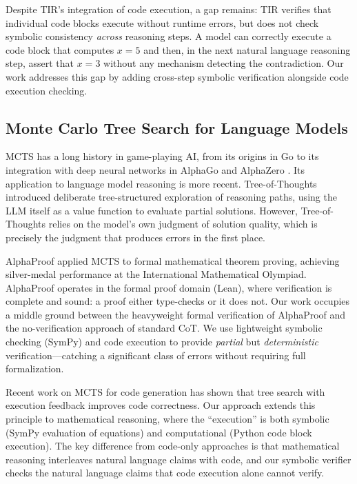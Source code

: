 \documentclass[11pt,a4paper]{article}
\begin{document}
Despite TIR's integration of code execution, a gap remains: TIR verifies that
individual code blocks execute without runtime errors, but does not check
symbolic consistency \emph{across} reasoning steps. A model can correctly
execute a code block that computes $x = 5$ and then, in the next natural
language reasoning step, assert that $x = 3$ without any mechanism detecting
the contradiction. Our work addresses this gap by adding cross-step symbolic
verification alongside code execution checking.

\subsection{Monte Carlo Tree Search for Language Models}

MCTS has a long history in game-playing AI, from its origins in Go
\citep{coulom2006efficient, kocsis2006bandit} to its integration with deep
neural networks in AlphaGo and AlphaZero \citep{silver2017mastering}. Its
application to language model reasoning is more recent. Tree-of-Thoughts
\citep{yao2023tree} introduced deliberate tree-structured exploration of
reasoning paths, using the LLM itself as a value function to evaluate partial
solutions. However, Tree-of-Thoughts relies on the model's own judgment of
solution quality, which is precisely the judgment that produces errors in the
first place.

AlphaProof \citep{deepmind2024alphaproof} applied MCTS to formal mathematical
theorem proving, achieving silver-medal performance at the International
Mathematical Olympiad. AlphaProof operates in the formal proof domain (Lean),
where verification is complete and sound: a proof either type-checks or it does
not. Our work occupies a middle ground between the heavyweight formal
verification of AlphaProof and the no-verification approach of standard CoT.
We use lightweight symbolic checking (SymPy) and code execution to provide
\emph{partial} but \emph{deterministic} verification---catching a significant
class of errors without requiring full formalization.

Recent work on MCTS for code generation \citep{zhang2023planning} has shown
that tree search with execution feedback improves code correctness. Our approach
extends this principle to mathematical reasoning, where the ``execution'' is
both symbolic (SymPy evaluation of equations) and computational (Python code
block execution). The key difference from code-only approaches is that
mathematical reasoning interleaves natural language claims with code, and our
symbolic verifier checks the natural language claims that code execution alone
cannot verify.
\end{document}
